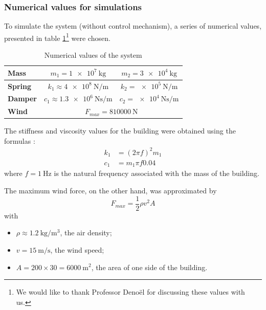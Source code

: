 \subsubsection{Numerical values for simulations}
\label{sec:numerical_values}
To simulate the system (without control mechanism), a series of numerical values, presented in table \ref{tab:numerical_values}\footnote{We would like to thank Professor Denoël for discussing these values with us.} were chosen.
\begin{table}[H]
    \centering
    \begin{tabular}{|l|c|c|}
        \hline
        {\bf Mass} & $m_1 = \SI{1e7}{\kilogram}$ & $m_2 = \SI{3e4}{\kilogram}$\\ \hline
        {\bf Spring} & $k_1 \approx \SI{4e8}{\newton/\meter}$ & $k_2 = \SI{e5}{\newton/\meter}$\\ \hline
        {\bf Damper} & $c_1 \approx \SI{1.3e6}{\newton\second/\meter}$ & $c_2 = \SI{e4}{\newton\second/\meter}$\\ \hline
        {\bf Wind} & \multicolumn{2}{c|}{$F_{max} = \SI{810000}{\newton}$}\\ \hline
    \end{tabular}
    \caption{Numerical values of the system}
    \label{tab:numerical_values}
\end{table}
The stiffness and viscosity values for the building were obtained using the formulas :
\begin{align*}
    k_1 &= (2\pi f)^2m_1\\
    c_1 &= m_1\pi f0.04
\end{align*}
where $f = \SI{1}{\hertz}$ is the natural frequency associated with the mass of the building.\par
The maximum wind force, on the other hand, was approximated by
\begin{equation*}
    F_{max} = \frac{1}{2}\rho v^2A
\end{equation*}
with
\begin{itemize}
    \item $\rho \approx \SI{1.2}{\kilogram/\meter\cubed}$, the air density;
    \item $v = \SI{15}{\meter/\second}$, the wind speed;
    \item $A = 200\times 30 = \SI{6000}{\meter\squared}$, the area of one side of the building.
\end{itemize}
